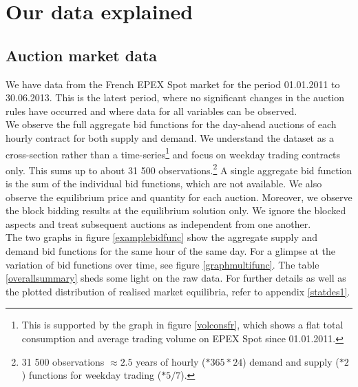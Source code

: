 \section{Our data explained}

\label{pschapter}

\label{datasection}
\subsection*{Auction market data}
We have data from the French EPEX Spot market for the period 01.01.2011 to 30.06.2013. This is the latest period, where no significant changes in the auction rules have occurred and where data for all variables can be observed. \\

We observe the full aggregate bid functions for the day-ahead auctions of each hourly contract for both supply and demand. 
We understand the dataset as a cross-section rather than a time-series\footnote{This is supported by the graph in figure \ref{volconsfr}, which shows a flat total consumption and average trading volume on EPEX Spot since 01.01.2011.} and focus on weekday trading contracts only. 
This sums up to about 31 500 observations.\footnote{31 500 observations $\approx 2.5$ years of hourly ($*365 *24$) demand and supply ($*2$) functions for weekday trading ($*5/7$).} A single aggregate bid function is the sum of the individual bid functions, which are not available. %
We also observe the equilibrium price and quantity for each auction. Moreover, we observe the block bidding results at the equilibrium solution only. We ignore the blocked aspects and treat subsequent auctions as independent from one another.\\
	
The two graphs in figure \ref{examplebidfunc} show the aggregate supply and demand bid functions for the same hour of the same day. For a glimpse at the variation of bid functions over time, see figure \ref{graphmultifunc}. The table \ref{overallsummary} sheds some light on the raw data. For further details as well as the plotted distribution of realised market equilibria, refer to appendix \ref{statdes1}. \\

